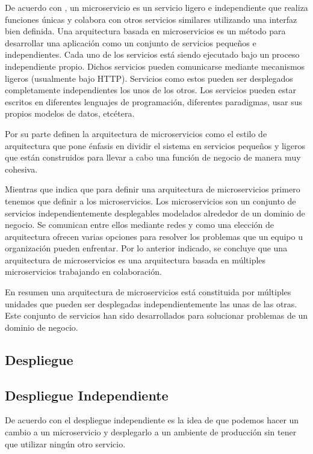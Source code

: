 De acuerdo con \cite{dmitry2014micro}, un microservicio es un servicio ligero e independiente que
realiza funciones únicas y colabora con otros servicios similares utilizando una interfaz bien definida.
Una arquitectura basada en microservicios es un método para desarrollar una aplicación como un conjunto
de servicios pequeños e independientes. Cada uno de los servicios está siendo ejecutado bajo un
proceso independiente propio. Dichos servicios pueden comunicarse mediante mecanismos ligeros (usualmente
bajo HTTP). Servicios como estos pueden ser desplegados completamente independientes los unos de los otros.
Los servicios pueden estar escritos en diferentes lenguajes de programación, diferentes paradigmas,
usar sus propios modelos de datos, etcétera.

Por su parte \cite{alshuqayran2016systematic} definen la arquitectura de microservicios como el estilo de arquitectura
que pone énfasis en dividir el sistema en servicios pequeños y ligeros que están construidos para
llevar a cabo una función de negocio de manera muy cohesiva.

Mientras que \cite{newman2019monolith} indica que para definir una arquitectura de microservicios primero tenemos que
definir a los microservicios. Los microservicios son un conjunto de servicios independientemente
desplegables modelados alrededor de un dominio de negocio. Se comunican entre ellos mediante redes
y como una elección de arquitectura ofrecen varias opciones para resolver los problemas que un
equipo u organización pueden enfrentar. Por lo anterior indicado, se concluye que una arquitectura
de microservicios es una arquitectura basada en múltiples microservicios trabajando en colaboración.

En resumen una arquitectura de microservicios está constituida por múltiples unidades que pueden ser
desplegadas independientemente las unas de las otras. Este conjunto de servicios han sido desarrollados
para solucionar problemas de un dominio de negocio.


\subsection{Despliegue}

\subsection{Despliegue Independiente}
De acuerdo con \cite{newman2019monolith} el despliegue independiente es la idea de que podemos
hacer un cambio a un microservicio y desplegarlo a un ambiente de producción sin tener que utilizar
ningún otro servicio.

